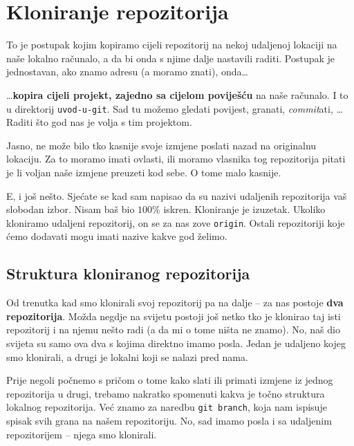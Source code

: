 \section*{Kloniranje repozitorija}

To je postupak kojim kopiramo cijeli repozitorij na nekoj udaljenoj lokaciji na naše lokalno računalo, a da bi onda s njime dalje nastavili raditi.
Postupak je jednostavan, ako znamo adresu (a moramo znati), onda\dots



\dots{}\textbf{kopira cijeli projekt, zajedno sa cijelom poviješću} na naše računalo.
I to u direktorij \verb+uvod-u-git+.
Sad tu možemo gledati povijest, granati, \emph{commit}ati, \dots Raditi što god nas je volja s tim projektom.

Jasno, ne može bilo tko kasnije svoje izmjene poslati nazad na originalnu lokaciju. 
Za to moramo imati ovlasti, ili moramo vlasnika tog repozitorija pitati je li voljan naše izmjene preuzeti kod sebe.
O tome malo kasnije.

E, i još nešto. Sjećate se kad sam napisao da su nazivi udaljenih repozitorija vaš slobodan izbor.
Nisam baš bio $100\%$ iskren. 
Kloniranje je izuzetak.
Ukoliko kloniramo udaljeni repozitorij, on se za nas zove \verb+origin+.
Ostali repozitoriji koje ćemo dodavati mogu imati nazive kakve god želimo.

\subsection*{Struktura kloniranog repozitorija}

Od trenutka kad smo klonirali svoj repozitorij pa na dalje -- za nas postoje \textbf{dva repozitorija}.
Možda negdje na svijetu postoji još netko tko je klonirao taj isti repozitorij i na njemu nešto radi (a da mi o tome ništa ne znamo).
No, naš dio svijeta su samo ova dva s kojima direktno imamo posla. 
Jedan je udaljeno kojeg smo klonirali, a drugi je lokalni koji se nalazi pred nama.

Prije negoli počnemo s pričom o tome kako slati ili primati izmjene iz jednog repozitorija u drugi, trebamo nakratko spomenuti kakva je točno struktura lokalnog repozitorija.
Već znamo za naredbu \verb+git branch+, koja nam ispisuje spisak svih grana na našem repozitoriju.
No, sad imamo posla i sa udaljenim repozitorijem -- njega smo klonirali.

